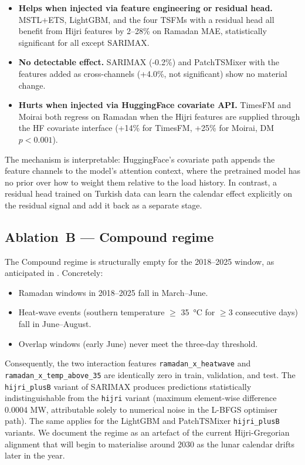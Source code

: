 \documentclass[10pt, a4paper, twocolumn]{article}
\begin{document}
\begin{itemize}\setlength\itemsep{2pt}
  \item \textbf{Helps when injected via feature
    engineering or residual head.} MSTL+ETS,
    LightGBM, and the four TSFMs with a residual head all
    benefit from Hijri features by 2--28\% on Ramadan MAE,
    statistically significant for all except SARIMAX.
  \item \textbf{No detectable effect.} SARIMAX (-0.2\%) and
    PatchTSMixer with the features added as cross-channels
    (+4.0\%, not significant) show no material change.
  \item \textbf{Hurts when injected via HuggingFace covariate
    API.} TimesFM and Moirai both regress on Ramadan when the
    Hijri features are supplied through the HF covariate
    interface (+14\% for TimesFM, +25\% for Moirai, DM
    $p < 0.001$).
\end{itemize}

The mechanism is interpretable: HuggingFace's covariate path
appends the feature channels to the model's attention context,
where the pretrained model has no prior over how to weight them
relative to the load history. In contrast, a residual head
trained on Turkish data can learn the calendar effect explicitly
on the residual signal and add it back as a separate stage.


\subsection{Ablation~B --- Compound regime}
\label{sec:results:ablation_b}

The Compound regime is structurally empty for the 2018--2025
window, as anticipated in . Concretely:

\begin{itemize}\setlength\itemsep{1pt}
  \item Ramadan windows in 2018--2025 fall in March--June.
  \item Heat-wave events (southern temperature $\geq$
    \SI{35}{\celsius} for $\geq 3$ consecutive days) fall in
    June--August.
  \item Overlap windows (early June) never meet the three-day
    threshold.
\end{itemize}

Consequently, the two
interaction features \texttt{ramadan\_x\_heatwave} and
\texttt{ramadan\_x\_temp\_above\_35} are identically zero in
train, validation, and test. The
\texttt{hijri\_plusB} variant of SARIMAX produces predictions
statistically indistinguishable from the \texttt{hijri} variant
(maximum element-wise difference \num{0.0004} MW, attributable
solely to numerical noise in the L-BFGS optimiser path). The same
applies for the LightGBM and PatchTSMixer \texttt{hijri\_plusB}
variants. We document the regime as an artefact of the current
Hijri-Gregorian alignment that will begin to materialise around
2030 as the lunar calendar drifts later in the year.
\end{document}
